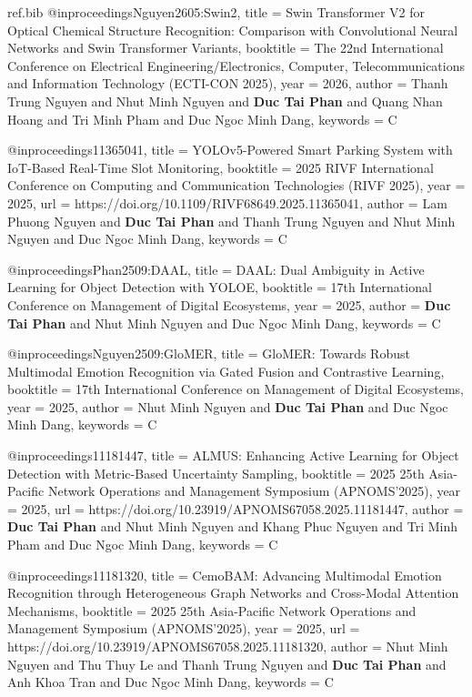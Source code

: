\begin{filecontents*}{ref.bib}
@inproceedings{Nguyen2605:Swin2,
  title = {Swin Transformer V2 for Optical Chemical Structure Recognition: Comparison with Convolutional Neural Networks and Swin Transformer Variants},
  booktitle = {The 22nd International Conference on Electrical Engineering/Electronics, Computer, Telecommunications and Information Technology (ECTI-CON 2025)},
  year = {2026},
  author = {Thanh Trung Nguyen and Nhut Minh Nguyen and \textbf{Duc Tai Phan} and Quang Nhan Hoang and Tri Minh Pham and Duc Ngoc Minh Dang},
  keywords = {C}
}

@inproceedings{11365041,
  title = {YOLOv5-Powered Smart Parking System with IoT-Based Real-Time Slot Monitoring},
  booktitle = {2025 RIVF International Conference on Computing and Communication Technologies (RIVF 2025)},
  year = {2025},
  url = {https://doi.org/10.1109/RIVF68649.2025.11365041},
  author = {Lam Phuong Nguyen and \textbf{Duc Tai Phan} and Thanh Trung Nguyen and Nhut Minh Nguyen and Duc Ngoc Minh Dang},
  keywords = {C}
}

@inproceedings{Phan2509:DAAL,
  title = {DAAL: Dual Ambiguity in Active Learning for Object Detection with YOLOE},
  booktitle = {17th International Conference on Management of Digital Ecosystems},
  year = {2025},
  author = {\textbf{Duc Tai Phan} and Nhut Minh Nguyen and Duc Ngoc Minh Dang},
  keywords = {C}
}

@inproceedings{Nguyen2509:GloMER,
  title = {GloMER: Towards Robust Multimodal Emotion Recognition via Gated Fusion and Contrastive Learning},
  booktitle = {17th International Conference on Management of Digital Ecosystems},
  year = {2025},
  author = {Nhut Minh Nguyen and \textbf{Duc Tai Phan} and Duc Ngoc Minh Dang},
  keywords = {C}
}

@inproceedings{11181447,
  title = {ALMUS: Enhancing Active Learning for Object Detection with Metric-Based Uncertainty Sampling},
  booktitle = {2025 25th Asia-Pacific Network Operations and Management Symposium (APNOMS'2025)},
  year = {2025},
  url = {https://doi.org/10.23919/APNOMS67058.2025.11181447},
  author = {\textbf{Duc Tai Phan} and Nhut Minh Nguyen and Khang Phuc Nguyen and Tri Minh Pham and Duc Ngoc Minh Dang},
  keywords = {C}
}

@inproceedings{11181320,
  title = {CemoBAM: Advancing Multimodal Emotion Recognition through Heterogeneous Graph Networks and Cross-Modal Attention Mechanisms},
  booktitle = {2025 25th Asia-Pacific Network Operations and Management Symposium (APNOMS'2025)},
  year = {2025},
  url = {https://doi.org/10.23919/APNOMS67058.2025.11181320},
  author = {Nhut Minh Nguyen and Thu Thuy Le and Thanh Trung Nguyen and \textbf{Duc Tai Phan} and Anh Khoa Tran and Duc Ngoc Minh Dang},
  keywords = {C}
}


\end{filecontents*}
